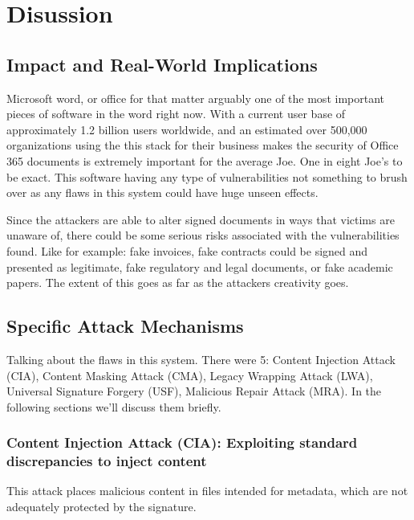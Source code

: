 \documentclass[conference]{IEEEtran}
\begin{document}
    \section{Disussion}
    
    \subsection{Impact and Real-World Implications}
        Microsoft word, or office for that matter arguably one of the most important pieces of software in the word right now. With a current user base of approximately 1.2 billion users worldwide\cite{ms-office-stats}, and an estimated over 500,000 organizations using the this stack for their business makes the security of Office 365 documents is extremely important for the average Joe. One in eight Joe's to be exact. This software having any type of vulnerabilities not something to brush over as any flaws in this system could have huge unseen effects.

        Since the attackers are able to alter signed documents in ways that victims are unaware of, there could be some serious risks associated with the vulnerabilities found. Like for example: fake invoices, fake contracts could be signed and presented as legitimate, fake regulatory and legal documents, or fake academic papers. The extent of this goes as far as the attackers creativity goes.
        
    \subsection{Specific Attack Mechanisms}
        Talking about the flaws in this system. There were 5: Content Injection Attack (CIA), Content Masking Attack (CMA), Legacy Wrapping Attack (LWA), Universal Signature Forgery (USF), Malicious Repair Attack (MRA). In the following sections we'll discuss them briefly.
        
        \subsubsection{Content Injection Attack (CIA): Exploiting standard discrepancies to inject content}
            This attack places malicious content in files intended for metadata, which are not adequately protected by the signature.
\end{document}
